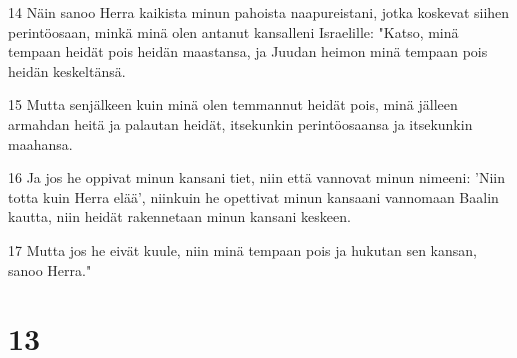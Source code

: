 \par 14 Näin sanoo Herra kaikista minun pahoista naapureistani, jotka koskevat siihen perintöosaan, minkä minä olen antanut kansalleni Israelille: "Katso, minä tempaan heidät pois heidän maastansa, ja Juudan heimon minä tempaan pois heidän keskeltänsä.
\par 15 Mutta senjälkeen kuin minä olen temmannut heidät pois, minä jälleen armahdan heitä ja palautan heidät, itsekunkin perintöosaansa ja itsekunkin maahansa.
\par 16 Ja jos he oppivat minun kansani tiet, niin että vannovat minun nimeeni: 'Niin totta kuin Herra elää', niinkuin he opettivat minun kansaani vannomaan Baalin kautta, niin heidät rakennetaan minun kansani keskeen.
\par 17 Mutta jos he eivät kuule, niin minä tempaan pois ja hukutan sen kansan, sanoo Herra."

\chapter{13}

